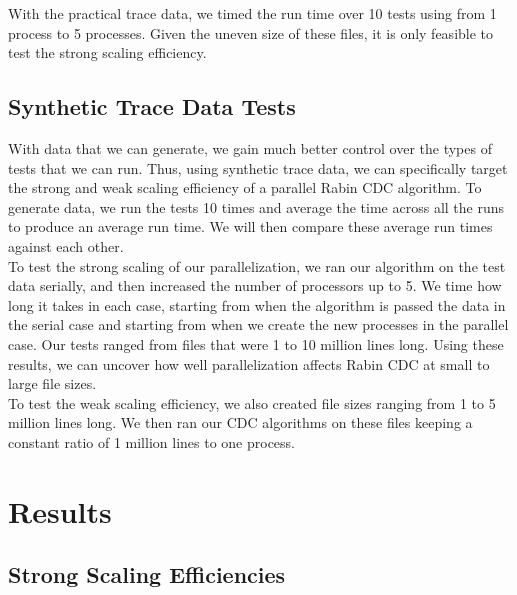 \documentclass{acmtog} %
\begin{document}
	With the practical trace data, we timed the run time over 10 tests using from 1 process to 5 processes. Given the uneven size of these files, it is only feasible to test the strong scaling efficiency.
	\subsection{Synthetic Trace Data Tests}
	With data that we can generate, we gain much better control over the types of tests that we can run. Thus, using synthetic trace data, we can specifically target the strong and weak scaling efficiency of a parallel Rabin CDC algorithm. To generate data, we run the tests 10 times and average the time across all the runs to produce an average run time. We will then compare these average run times against each other. \\
	
	To test the strong scaling of our parallelization, we ran our algorithm on the test data serially, and then increased the number of processors up to 5. We time how long it takes in each case, starting from when the algorithm is passed the data in the serial case and starting from when we create the new processes in the parallel case. Our tests ranged from files that were 1 to 10 million lines long. Using these results, we can uncover how well parallelization affects Rabin CDC at small to large file sizes.\\
	
	To test the weak scaling efficiency, we also created file sizes ranging from 1 to 5 million lines long. We then ran our CDC algorithms on these files keeping a constant ratio of 1 million lines to one process. \\ 
	
	\section{Results}
	\subsection{Strong Scaling Efficiencies}
\end{document}

